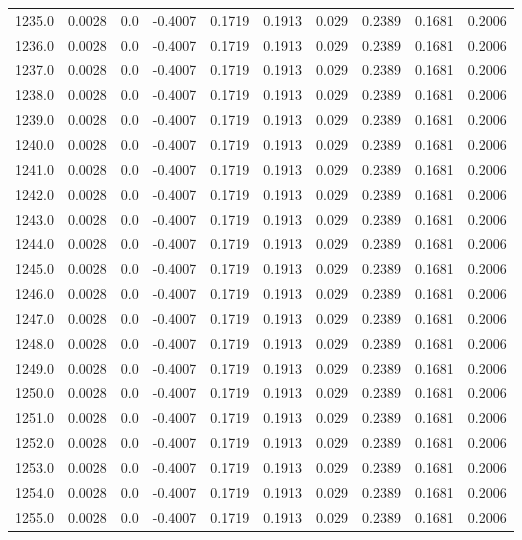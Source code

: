 \begin{longtable}{lrrrrrrrrr}
1235.0 & 0.0028 & 0.0 & -0.4007 & 0.1719 & 0.1913 & 0.029 & 0.2389 & 0.1681 & 0.2006 \\
1236.0 & 0.0028 & 0.0 & -0.4007 & 0.1719 & 0.1913 & 0.029 & 0.2389 & 0.1681 & 0.2006 \\
1237.0 & 0.0028 & 0.0 & -0.4007 & 0.1719 & 0.1913 & 0.029 & 0.2389 & 0.1681 & 0.2006 \\
1238.0 & 0.0028 & 0.0 & -0.4007 & 0.1719 & 0.1913 & 0.029 & 0.2389 & 0.1681 & 0.2006 \\
1239.0 & 0.0028 & 0.0 & -0.4007 & 0.1719 & 0.1913 & 0.029 & 0.2389 & 0.1681 & 0.2006 \\
1240.0 & 0.0028 & 0.0 & -0.4007 & 0.1719 & 0.1913 & 0.029 & 0.2389 & 0.1681 & 0.2006 \\
1241.0 & 0.0028 & 0.0 & -0.4007 & 0.1719 & 0.1913 & 0.029 & 0.2389 & 0.1681 & 0.2006 \\
1242.0 & 0.0028 & 0.0 & -0.4007 & 0.1719 & 0.1913 & 0.029 & 0.2389 & 0.1681 & 0.2006 \\
1243.0 & 0.0028 & 0.0 & -0.4007 & 0.1719 & 0.1913 & 0.029 & 0.2389 & 0.1681 & 0.2006 \\
1244.0 & 0.0028 & 0.0 & -0.4007 & 0.1719 & 0.1913 & 0.029 & 0.2389 & 0.1681 & 0.2006 \\
1245.0 & 0.0028 & 0.0 & -0.4007 & 0.1719 & 0.1913 & 0.029 & 0.2389 & 0.1681 & 0.2006 \\
1246.0 & 0.0028 & 0.0 & -0.4007 & 0.1719 & 0.1913 & 0.029 & 0.2389 & 0.1681 & 0.2006 \\
1247.0 & 0.0028 & 0.0 & -0.4007 & 0.1719 & 0.1913 & 0.029 & 0.2389 & 0.1681 & 0.2006 \\
1248.0 & 0.0028 & 0.0 & -0.4007 & 0.1719 & 0.1913 & 0.029 & 0.2389 & 0.1681 & 0.2006 \\
1249.0 & 0.0028 & 0.0 & -0.4007 & 0.1719 & 0.1913 & 0.029 & 0.2389 & 0.1681 & 0.2006 \\
1250.0 & 0.0028 & 0.0 & -0.4007 & 0.1719 & 0.1913 & 0.029 & 0.2389 & 0.1681 & 0.2006 \\
1251.0 & 0.0028 & 0.0 & -0.4007 & 0.1719 & 0.1913 & 0.029 & 0.2389 & 0.1681 & 0.2006 \\
1252.0 & 0.0028 & 0.0 & -0.4007 & 0.1719 & 0.1913 & 0.029 & 0.2389 & 0.1681 & 0.2006 \\
1253.0 & 0.0028 & 0.0 & -0.4007 & 0.1719 & 0.1913 & 0.029 & 0.2389 & 0.1681 & 0.2006 \\
1254.0 & 0.0028 & 0.0 & -0.4007 & 0.1719 & 0.1913 & 0.029 & 0.2389 & 0.1681 & 0.2006 \\
1255.0 & 0.0028 & 0.0 & -0.4007 & 0.1719 & 0.1913 & 0.029 & 0.2389 & 0.1681 & 0.2006 \\

\end{longtable}
